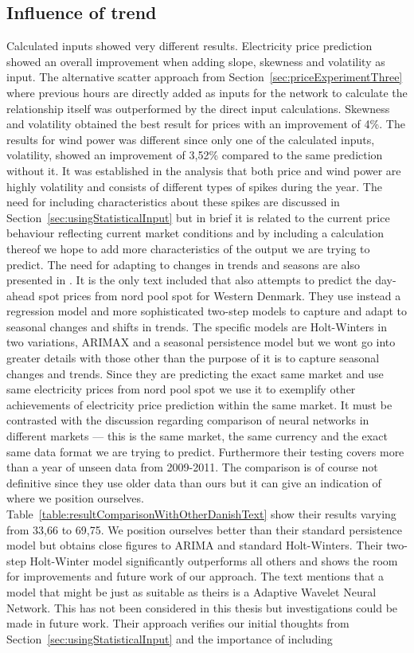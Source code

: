 \subsection{Influence of trend}
\label{sec:influenceOfTrendInCalcInput}
Calculated inputs showed very different results. Electricity price prediction showed an overall improvement when adding slope, skewness and volatility as input. The alternative scatter approach from Section~\ref{sec:priceExperimentThree} where previous hours are directly added as inputs for the network to calculate the relationship itself was outperformed by the direct input calculations. Skewness and volatility obtained the best result for prices with an improvement of 4\%. The results for wind power was different since only one of the calculated inputs, volatility, showed an improvement of 3,52\% compared to the same prediction without it. It was established in the analysis that both price and wind power are highly volatility and consists of different types of spikes during the year. The need for including characteristics about these spikes are discussed in Section~\ref{sec:usingStatisticalInput} but in brief it is related to the current price behaviour reflecting current market conditions and by including a calculation thereof we hope to add more characteristics of the output we are trying to predict. The need for adapting to changes in trends and seasons are also presented in \cite{forecastingSpotPricesAccountingForWindPower}. It is the only text included that also attempts to predict the day-ahead spot prices from nord pool spot for Western Denmark. They use instead a regression model and more sophisticated two-step models to capture and adapt to seasonal changes and shifts in trends. The specific models are Holt-Winters in two variations, ARIMAX and a seasonal persistence model but we wont go into greater details with those other than the purpose of it is to capture seasonal changes and trends. Since they are predicting the exact same market and use same electricity prices from nord pool spot we use it to exemplify other achievements of electricity price prediction within the same market. It must be contrasted with the discussion regarding comparison of neural networks in different markets --- this is the same market, the same currency and the exact same data format we are trying to predict. Furthermore their testing covers more than a year of unseen data from 2009-2011. The comparison is of course not definitive since they use older data than ours but it can give an indication of where we position ourselves. Table~\ref{table:resultComparisonWithOtherDanishText} show their results varying from 33,66 to 69,75. We position ourselves better than their standard persistence model but obtains close figures to ARIMA and standard Holt-Winters. Their two-step Holt-Winter model significantly outperforms all others and shows the room for improvements and future work of our approach. The text mentions that a model that might be just as suitable as theirs is a Adaptive Wavelet Neural Network. This has not been considered in this thesis but investigations could be made in future work. Their approach verifies our initial thoughts from Section~\ref{sec:usingStatisticalInput} and the importance of including 